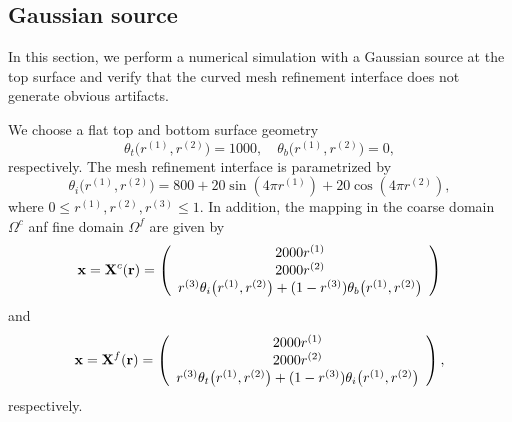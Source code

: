 \subsection{Gaussian source}\label{gaussian_source}
In this section, we perform a numerical simulation with a Gaussian source at the top surface and verify that  the curved mesh refinement interface does not generate obvious artifacts. 

We choose a flat top and bottom surface geometry 
\begin{equation*}
\theta_t\big(r^{(1)},r^{(2)}\big) = 1000,\quad \theta_b\big(r^{(1)},r^{(2)}\big) = 0,
\end{equation*}
respectively. The mesh refinement interface is parametrized by
\begin{equation}\label{interface_gausian}
\theta_i\big(r^{(1)},r^{(2)}\big) = 800+20\sin(4\pi r^{(1)})+20\cos(4\pi r^{(2)}),
\end{equation}
where $0\leq r^{(1)}, r^{(2)}, r^{(3)}\leq 1$. 
In addition, the mapping in the coarse domain $\Omega^c$ anf fine domain $\Omega^f$ are given by 
\[ {\bf x} = {\bf X}^c({\bf r}) = \left(\begin{array}{c}
2000 r^{(1)}\\
2000 r^{(2)}\\
r^{(3)} \theta_i\big(r^{(1)}, r^{(2)}\big) + (1-r^{(3)}) \theta_b\big(r^{(1)},r^{(2)}\big) \end{array}\right) \]
and 
\[ {\bf x} = {\bf X}^f({\bf r}) = \left(\begin{array}{c}
2000 r^{(1)}\\
2000 r^{(2)}\\
r^{(3)}\theta_t\big(r^{(1)},r^{(2)}\big) + (1-r^{(3)})\theta_i\big(r^{(1)},r^{(2)}\big)\end{array}\right), \]
respectively. 
